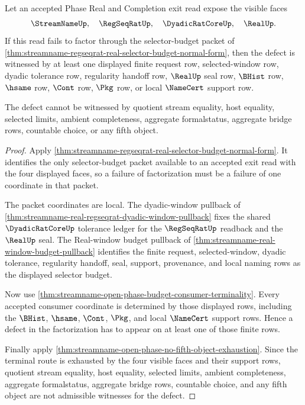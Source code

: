 \begin{theorem}
\label{thm:streamname-selector-budget-defect-localization}
Let an accepted Phase Real and Completion exit read expose the visible faces
$$
\StreamNameUp,\quad \RegSeqRatUp,\quad \DyadicRatCoreUp,\quad \RealUp.
$$
If this read fails to factor through the selector-budget packet of \autoref{thm:streamname-regseqrat-real-selector-budget-normal-form}, then the defect is witnessed by at least one displayed finite request row, selected-window row, dyadic tolerance row, regularity handoff row, $\RealUp$ seal row, $\BHist$ row, $\hsame$ row, $\Cont$ row, $\Pkg$ row, or local $\NameCert$ support row.

The defect cannot be witnessed by quotient stream equality, host equality, selected limits, ambient completeness, aggregate formalstatus, aggregate bridge rows, countable choice, or any fifth object.
\end{theorem}
\begin{proof}
Apply \autoref{thm:streamname-regseqrat-real-selector-budget-normal-form}. It identifies the only selector-budget packet available to an accepted exit read with the four displayed faces, so a failure of factorization must be a failure of one coordinate in that packet.

The packet coordinates are local. The dyadic-window pullback of \autoref{thm:streamname-real-regseqrat-dyadic-window-pullback} fixes the shared $\DyadicRatCoreUp$ tolerance ledger for the $\RegSeqRatUp$ readback and the $\RealUp$ seal. The Real-window budget pullback of \autoref{thm:streamname-real-window-budget-pullback} identifies the finite request, selected-window, dyadic tolerance, regularity handoff, seal, support, provenance, and local naming rows as the displayed selector budget.

Now use \autoref{thm:streamname-open-phase-budget-consumer-terminality}. Every accepted consumer coordinate is determined by those displayed rows, including the $\BHist$, $\hsame$, $\Cont$, $\Pkg$, and local $\NameCert$ support rows. Hence a defect in the factorization has to appear on at least one of those finite rows.

Finally apply \autoref{thm:streamname-open-phase-no-fifth-object-exhaustion}. Since the terminal route is exhausted by the four visible faces and their support rows, quotient stream equality, host equality, selected limits, ambient completeness, aggregate formalstatus, aggregate bridge rows, countable choice, and any fifth object are not admissible witnesses for the defect.
\end{proof}


